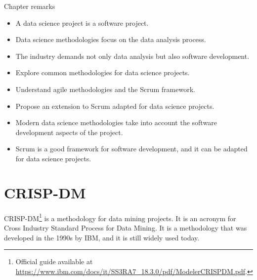 \begin{mainbox}{Chapter remarks}


  \startcontents[chapters]
  \vspace{1em}


  \begin{itemize}
    \itemsep0em
    \item A data science project is a software project.
    \item Data science methodologies focus on the data analysis process.
    \item The industry demands not only data analysis but also software development.
  \end{itemize}


  \begin{itemize}
    \itemsep0em
    \item Explore common methodologies for data science projects.
    \item Understand agile methodologies and the Scrum framework.
    \item Propose an extension to Scrum adapted for data science projects.
  \end{itemize}


  \begin{itemize}
    \itemsep0em
    \item Modern data science methodologies take into account the software development aspects of the
      project.
    \item Scrum is a good framework for software development, and it can be adapted for
      data science projects.
  \end{itemize}
\end{mainbox}

{}
\clearpage

\section{CRISP-DM}

CRISP-DM\footnote{Official guide available at
\url{https://www.ibm.com/docs/it/SS3RA7_18.3.0/pdf/ModelerCRISPDM.pdf}.} is a methodology
for data mining projects.  It is an acronym for Cross Industry Standard Process for Data
Mining.  It is a methodology that was developed in the 1990s by IBM, and it is still
widely used today.

